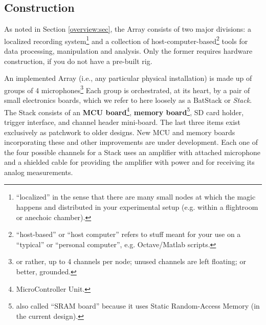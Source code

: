 \documentclass[letterpaper]{article}
\begin{document}
\subsection{Construction}
\label{construct:sec}

As noted in Section \ref{overview:sec}, the Array consists of two
major divisions: a localized recording system\footnote{``localized''
  in the sense that there are many small nodes at which the magic
  happens and distributed in your experimental setup (e.g. within a
  flightroom or anechoic chamber).} and a collection of
host-computer-based\footnote{``host-based'' or ``host computer''
  refers to stuff meant for your use on a ``typical'' or ``personal
  computer'', e.g. Octave/Matlab scripts.} tools for data processing,
manipulation and analysis. Only the former requires hardware
construction, if you do not have a pre-built rig.

An implemented Array (i.e., any particular physical installation) is
made up of groups of 4 microphones\footnote{or rather, up to 4
  channels per node; unused channels are left floating; or better,
  grounded.} Each group is orchestrated, at its heart, by a pair of
small electronics boards, which we refer to here loosely as a BatStack
or \textit{Stack}. The Stack consists of an \textbf{MCU
  board}\footnote{MicroController Unit.}, \textbf{memory
  board}\footnote{also called ``SRAM board'' because it uses Static
  Random-Access Memory (in the current design).}, SD card holder,
trigger interface, and channel header mini-board. The last three items
exist exclusively as patchwork to older designs. New MCU and memory
boards incorporating these and other improvements are under
development.  Each one of the four possible channels for a Stack uses
an amplifier with attached microphone and a shielded cable for
providing the amplifier with power and for receiving its analog
measurements.
\end{document}
